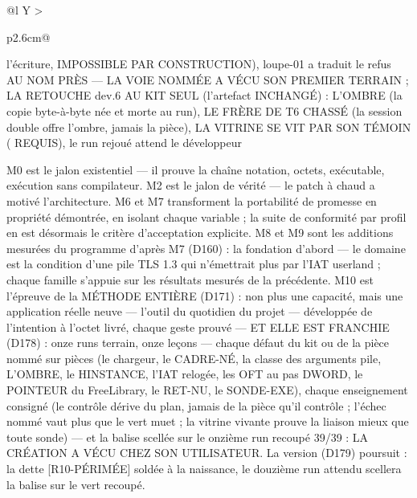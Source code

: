 \begin{table}[htbp]
\begin{tabularx}{\textwidth}{@{}l Y >{\raggedright\arraybackslash}p{2.6cm}@{}}
l'écriture, IMPOSSIBLE PAR CONSTRUCTION), loupe-01 a traduit le refus AU NOM PRÈS — LA VOIE NOMMÉE A VÉCU SON PREMIER TERRAIN ; LA RETOUCHE dev.6 AU KIT SEUL (l'artefact INCHANGÉ) : L'OMBRE  (la copie byte-à-byte née et morte au run), LE FRÈRE DE T6 CHASSÉ (la session double offre l'ombre, jamais la pièce), LA VITRINE SE VIT PAR SON TÉMOIN ( REQUIS), le run rejoué attend le développeur \\
\bottomrule
\end{tabularx}
\end{table}

M0 est le jalon existentiel — il prouve la chaîne notation, octets, exécutable, exécution
sans compilateur. M2 est le jalon de vérité — le patch à chaud a motivé l'architecture.
M6 et M7 transforment la portabilité de promesse en propriété démontrée, en isolant chaque
variable ; la suite de conformité par profil en est désormais le critère d'acceptation
explicite. M8 et M9 sont les additions mesurées du programme d'après M7 (D160) : la
fondation d'abord — le domaine  est la condition d'une pile TLS 1.3 qui
n'émettrait plus par l'IAT userland ; chaque famille s'appuie sur les résultats
mesurés de la précédente. M10 est l'épreuve de la MÉTHODE ENTIÈRE (D171) : non plus
une capacité, mais une application réelle neuve — l'outil du quotidien du projet —
développée de l'intention à l'octet livré, chaque geste prouvé — ET ELLE EST
FRANCHIE (D178) : onze runs terrain, onze leçons — chaque défaut du kit ou de la
pièce nommé sur pièces (le chargeur, le CADRE-NÉ, la classe des arguments pile,
L'OMBRE, le HINSTANCE, l'IAT relogée, les OFT au pas DWORD, le POINTEUR du
FreeLibrary, le RET-NU, le SONDE-EXE), chaque enseignement consigné (le contrôle
dérive du plan, jamais de la pièce qu'il contrôle ; l'échec nommé vaut plus que
le vert muet ; la vitrine vivante prouve la liaison mieux que toute sonde) — et
la balise  scellée sur le onzième run recoupé 39/39 : LA
CRÉATION A VÉCU CHEZ SON UTILISATEUR. La version  (D179)
poursuit : la dette [R10-PÉRIMÉE] soldée à la naissance, le douzième run attendu
scellera la balise  sur le vert recoupé.

